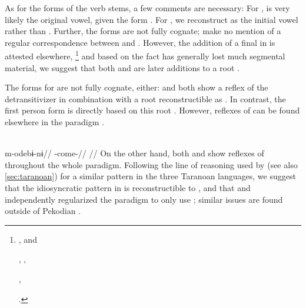 As for the forms of the verb stems, a few comments are necessary:
For , \ikpeng {} is very likely the original vowel, given the \PC form  .
For , we reconstruct  as the initial vowel rather than  .
Further, the forms are not fully cognate; \textcite{meira2005southern} make no mention of a regular correspondence between \bakairi {} and \ikpeng {}.
However, the addition of a final  in \PXin is attested elsewhere,%
\footnote{
\begin{inlinelist}
\item \PC {} , \arara and \ikpeng {} %
\item \PC {} , \arara {}, \ikpeng {} %
\item \PC {} , \arara {}  %
\end{inlinelist} \parencites[8]{gildea2007greenberg}[56, 144, 57]{alves2017arara}[25, 270]{ikpengpacheco2001}.}
and based on the fact \bakairi has generally lost much segmental material, we suggest that both  and  are later additions to a root .



The forms for  are not fully cognate, either: \ikpeng and \bakairi both show a reflex of the \PPek detransitivizer  in combination with a root reconstructible as .
In contrast, the \arara first person form is directly based on this root .
However, reflexes of  can be found elsewhere in the \arara paradigm .

\arara \parencite[][150]{alves2017arara}\\
\begingl
\gla m-odebɨ-nɨ//
\glb {}-come-//
\glft {}//
\endgl
\xe
%
On the other hand, both \ikpeng and \bakairi show reflexes of  throughout the whole paradigm.
Following the line of reasoning used by \textcite[114]{meira1998proto} (see also \cref{sec:taranoan}) for a similar pattern in the three Taranoan languages, we suggest that the idiosyncratic pattern in \arara is reconstructible to \PPek, and that \bakairi and \ikpeng independently regularized the paradigm to only use ; similar issues are found outside of Pekodian .

